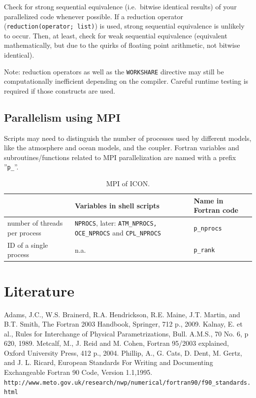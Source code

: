\documentclass[a4paper,11pt,DIV16,BCOR1cm,titlepage]{scrartcl}
\begin{document}
\begin{itemize}
{\color{red}
\item Check for strong sequential equivalence (i.e.\ bitwise identical results) of your 
parallelized code whenever possible. If a reduction operator (\texttt{reduction(operator; list)}) 
is used, strong sequential equivalence is unlikely to occur. Then, at least, check for weak 
sequential equivalence (equivalent mathematically, but due to the quirks of floating 
point arithmetic, not bitwise identical).}

\item Note: reduction operators as well as the \texttt{WORKSHARE} directive may still be 
computationally inefficient depending on the compiler. Careful runtime testing is required if 
those constructs are used.
\end{itemize}


\subsection{Parallelism using MPI}

Scripts may need to distinguish the number of processes used by different models, like the 
atmosphere and ocean models, and the coupler. Fortran variables and subroutines/functions 
related to MPI parallelization are named with a prefix ''\texttt{p\_}''.

\begin{table}[htb]
\renewcommand{\arraystretch}{1.4}
\begin{center}
\begin{tabular}{|p{5cm}|p{7 cm}|p{3cm}|}
\hline
\textbf{ }  & \textbf{Variables in shell scripts}  & \textbf{Name in Fortran code} \\ 
\hline\hline
number of threads per process & \texttt{NPROCS}, later: \texttt{ATM\_NPROCS, OCE\_NPROCS} and \texttt{CPL\_NPROCS} & \texttt{p\_nprocs} \\ 
ID of a single process     & n.a. & \texttt{p\_rank} \\ 
\hline
\end{tabular}
\caption{MPI of ICON.}\label{tbl_MPI}
\end{center}
\end{table}

\section{Literature}  
%
Adams, J.C., W.S. Brainerd, R.A. Hendrickson, R.E. Maine, J.T. Martin, and B.T. Smith,
The Fortran 2003 Handbook, Springer, 712 p., 2009.
%
Kalnay, E. et al., Rules for Interchange of Physical Parametrizations,   
Bull. A.M.S., 70 No. 6, p 620, 1989.  
%
Metcalf, M., J. Reid and M. Cohen, Fortran 95/2003 explained, 
Oxford University Press, 412 p., 2004.
%
Phillip, A., G. Cats, D. Dent, M. Gertz, and J. L. Ricard,  
European Standards For Writing and Documenting Exchangeable Fortran 90  
Code, Version 1.1,1995.\\  
\texttt{http://www.meto.gov.uk/research/nwp/numerical/fortran90/f90\_standards.html}  
 
\end{document}
